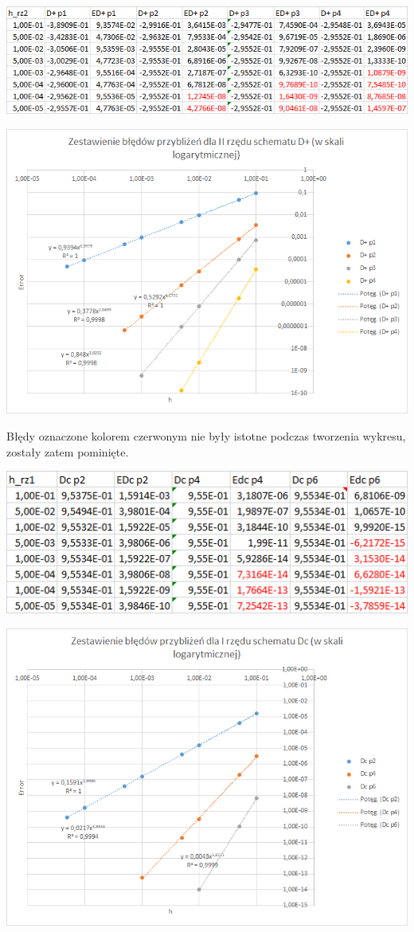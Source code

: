 \includegraphics{Lab2/charts/rz2_log_Df_dane.png}

\includegraphics{Lab2/charts/rz2_log_Df.png}
\newpage

Błędy oznaczone kolorem czerwonym nie były istotne podczas tworzenia wykresu, zostały zatem pominięte.

\includegraphics{Lab2/charts/rz1_log_Dc_dane.png}

\includegraphics{Lab2/charts/rz1_log_Dc.png}
\newpage

